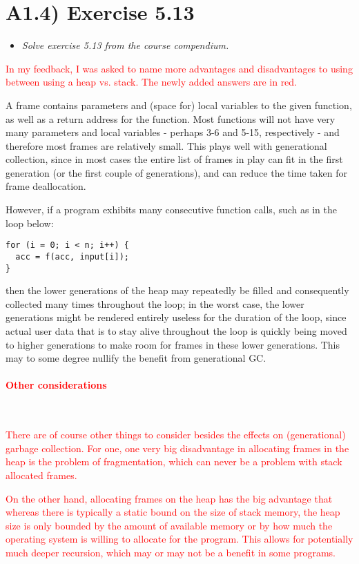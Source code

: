 

\newpage
\section{A1.4) Exercise 5.13}

\begin{itemize}
  \item \emph{Solve exercise 5.13 from the course compendium.}
\end{itemize}

\textcolor{red}{In my feedback, I was asked to name more advantages and
disadvantages to using between using a heap vs. stack. The newly added answers
are in red.}

\medskip

A frame contains parameters and (space for) local variables to the given
function, as well as a return address for the function. Most functions will not
have very many parameters and local variables - perhaps 3-6 and 5-15,
respectively - and therefore most frames are relatively small. This plays well
with generational collection, since in most cases the entire list of frames in
play can fit in the first generation (or the first couple of generations), and
can reduce the time taken for frame deallocation. \smallskip

However, if a program exhibits many consecutive function calls, such as in the loop
below:

\begin{verbatim}
for (i = 0; i < n; i++) {
  acc = f(acc, input[i]);
}
\end{verbatim}

then the lower generations of the heap may repeatedly be filled and consequently
collected many times throughout the loop; in the worst case, the lower
generations might be rendered entirely useless for the duration of the loop,
since actual user data that is to stay alive throughout the loop is quickly
being moved to higher generations to make room for frames in these lower
generations. This may to some degree nullify the benefit from generational GC.

\medskip

\paragraph{\textcolor{red}{Other considerations}}~\smallskip

\textcolor{red}{There are of course other things to consider besides the effects
on (generational) garbage collection. For one, one very big disadvantage in
allocating frames in the heap is the problem of fragmentation, which can never
be a problem with stack allocated frames.}

\medskip

\textcolor{red}{On the other hand, allocating frames on the heap has the big
advantage that whereas there is typically a static bound on the size of stack
memory, the heap size is only bounded by the amount of available memory or by
how much the operating system is willing to allocate for the program. This
allows for potentially much deeper recursion, which may or may not be a benefit
in some programs.}

\Sectend
